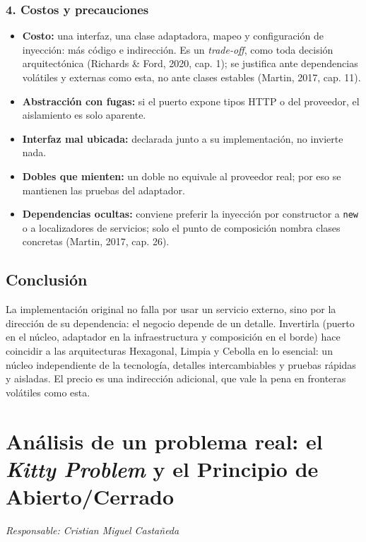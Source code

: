 \documentclass[11pt,a4paper]{article}
\newcommand{\responsable}[1]{\noindent\textit{Responsable: #1}\par\medskip}
\begin{document}
\subsubsection*{4. Costos y precauciones}

\begin{itemize}[leftmargin=1.4em]
\item \textbf{Costo:} una interfaz, una clase adaptadora, mapeo y configuración de inyección:
más código e indirección. Es un \emph{trade-off}, como toda decisión arquitectónica (Richards
\& Ford, 2020, cap. 1); se justifica ante dependencias volátiles y externas como esta, no ante
clases estables (Martin, 2017, cap. 11).
\item \textbf{Abstracción con fugas:} si el puerto expone tipos HTTP o del proveedor, el
aislamiento es solo aparente.
\item \textbf{Interfaz mal ubicada:} declarada junto a su implementación, no invierte nada.
\item \textbf{Dobles que mienten:} un doble no equivale al proveedor real; por eso se mantienen
las pruebas del adaptador.
\item \textbf{Dependencias ocultas:} conviene preferir la inyección por constructor a
\texttt{new} o a localizadores de servicios; solo el punto de composición nombra clases
concretas (Martin, 2017, cap. 26).
\end{itemize}

\subsection*{Conclusión}

La implementación original no falla por usar un servicio externo, sino por la dirección de su
dependencia: el negocio depende de un detalle. Invertirla (puerto en el núcleo, adaptador en
la infraestructura y composición en el borde) hace coincidir a las arquitecturas Hexagonal,
Limpia y Cebolla en lo esencial: un núcleo independiente de la tecnología, detalles
intercambiables y pruebas rápidas y aisladas. El precio es una indirección adicional, que vale
la pena en fronteras volátiles como esta.

\newpage
\section{Análisis de un problema real: el \emph{Kitty Problem} y el Principio de Abierto/Cerrado}
\responsable{Cristian Miguel Castañeda}
\end{document}
